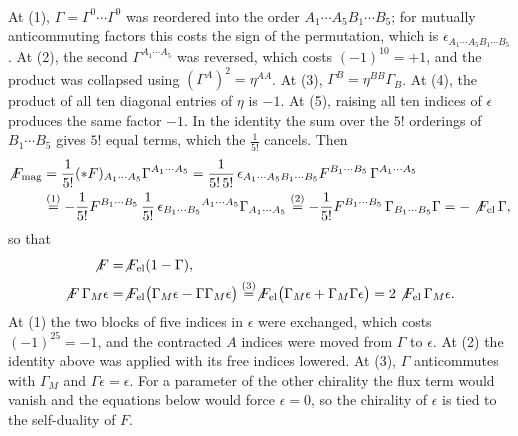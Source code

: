 \begin{tcolorbox}[breakable]
\begin{remark}
\begin{align*}
\end{align*}
At (1), $\Gamma = \Gamma^0\cdots\Gamma^9$ was reordered into the order $A_1\cdots A_5B_1\cdots B_5$; for mutually anticommuting factors this costs the sign of the permutation, which is $\epsilon_{A_1\cdots A_5B_1\cdots B_5}$. At (2), the second $\Gamma^{A_1\cdots A_5}$ was reversed, which costs $(-1)^{10} = +1$, and the product was collapsed using $(\Gamma^{A})^2 = \eta^{AA}$. At (3), $\Gamma^{B} = \eta^{BB}\Gamma_{B}$. At (4), the product of all ten diagonal entries of $\eta$ is $-1$. At (5), raising all ten indices of $\epsilon$ produces the same factor $-1$. In the identity the sum over the $5!$ orderings of $B_1\cdots B_5$ gives $5!$ equal terms, which the $\frac{1}{5!}$ cancels. Then
\begin{align*}
\not{F}_{\rm mag} &= \frac{1}{5!}(*F)_{A_1\cdots A_5}\Gamma^{A_1\cdots A_5}
= \frac{1}{5!\,5!}\,\epsilon_{A_1\cdots A_5B_1\cdots B_5}F^{B_1\cdots B_5}\,\Gamma^{A_1\cdots A_5} \\
&\overset{(1)}{=} -\frac{1}{5!}F^{B_1\cdots B_5}\,\frac{1}{5!}\,\epsilon_{B_1\cdots B_5}{}^{A_1\cdots A_5}\Gamma_{A_1\cdots A_5}
\overset{(2)}{=} -\frac{1}{5!}F^{B_1\cdots B_5}\,\Gamma_{B_1\cdots B_5}\Gamma = -\not{F}_{\rm el}\,\Gamma ,
\end{align*}
so that
\begin{align*}
\not{F} &= \not{F}_{\rm el}(1-\Gamma), \\
\not{F}\,\Gamma_M\epsilon &= \not{F}_{\rm el}\big(\Gamma_M\epsilon - \Gamma\Gamma_M\epsilon\big) \overset{(3)}{=} \not{F}_{\rm el}\big(\Gamma_M\epsilon + \Gamma_M\Gamma\epsilon\big) = 2\not{F}_{\rm el}\,\Gamma_M\epsilon .
\end{align*}
At (1) the two blocks of five indices in $\epsilon$ were exchanged, which costs $(-1)^{25} = -1$, and the contracted $A$ indices were moved from $\Gamma$ to $\epsilon$. At (2) the identity above was applied with its free indices lowered. At (3), $\Gamma$ anticommutes with $\Gamma_M$ and $\Gamma\epsilon = \epsilon$. For a parameter of the other chirality the flux term would vanish and the equations below would force $\epsilon = 0$, so the chirality of $\epsilon$ is tied to the self-duality of $F$.


\end{remark}
\end{tcolorbox}

